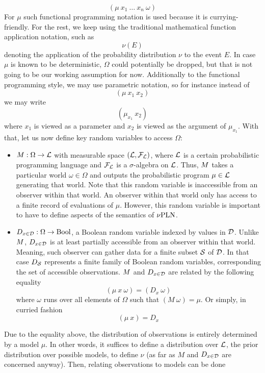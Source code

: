 \documentclass[]{article}
\begin{document}
$$(\mu\ x_1\ \dots\ x_n\ \omega)$$ For $\mu$ such functional
programming notation is used because it is currying-friendly.  For the
rest, we keep using the traditional mathematical function application
notation, such as
$$\nu(E)$$ denoting the application of the probability distribution
$\nu$ to the event $E$.  In case $\mu$ is known to be deterministic,
$\Omega$ could potentially be dropped, but that is not going to be our
working assumption for now.  Additionally to the functional
programming style, we may use parametric notation, so for instance
instead of
$$(\mu\ x_1\ x_2)$$ we may write
$$(\mu_{x_1}\ x_2)$$ where $x_1$ is viewed as a parameter and $x_2$ is
viewed as the argument of $\mu_{x_1}$.  With that, let us now define
key random variables to access $\Omega$:
\begin{itemize}
\item $M : \Omega \to \mathcal{L}$ with measurable space
  $(\mathcal{L}, \mathcal{F}_{\mathcal{L}})$, where $\mathcal{L}$ is a certain
  probabilistic programming language and $\mathcal{F}_{\mathcal{L}}$ is a
  $\sigma$-algebra on $\mathcal{L}$.  Thus, $M$ takes a particular
  world $\omega \in \Omega$ and outputs the probabilistic program $\mu
  \in \mathcal{L}$ generating that world.  Note that this random
  variable is inaccessible from an observer within that world.  An
  observer within that world only has access to a finite record of
  evaluations of $\mu$.  However, this random variable is important to
  have to define aspects of the semantics of $\nu\textup{PLN}$.
\item $D_{x\in\mathcal{D}} : \Omega \to \textup{Bool}$, a Boolean random variable indexed by
  values in $\mathcal{D}$.  Unlike $M$, $D_{x\in\mathcal{D}}$ is at least partially
  accessible from an observer within that world.  Meaning, such
  observer can gather data for a finite subset $\mathcal{S}$ of
  $\mathcal{D}$.  In that case $D_{\mathcal{S}}$ represents a finite family of
  Boolean random variables, corresponding the set of accessible
  observations.  $M$ and $D_{x\in\mathcal{D}}$ are related by the following
  equality
  $$(\mu\ x\ \omega) = (D_x\ \omega)$$ where $\omega$ runs over all
  elements of $\Omega$ such that $(M\ \omega) = \mu$.  Or simply, in
  curried fashion
  $$(\mu\ x) = D_x$$
\end{itemize}
Due to the equality above, the distribution of observations is
entirely determined by a model $\mu$.  In other words, it suffices to
define a distribution over $\mathcal{L}$, the prior distribution over
possible models, to define $\nu$ (as far as $M$ and $D_{x\in\mathcal{D}}$ are
concerned anyway).  Then, relating observations to models can be done
\end{document}
